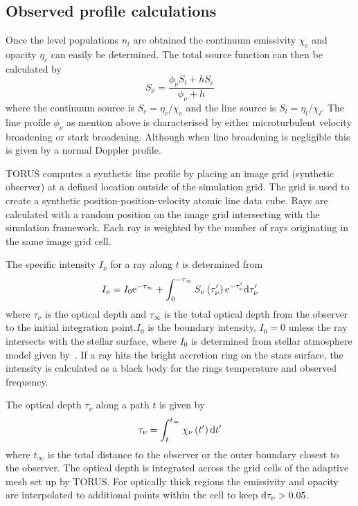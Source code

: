 \documentclass[fleqn,usenatbib]{mnras}
\begin{document}
\subsection{Observed profile calculations}
\label{sec:profilecalculations}
Once the level populations $n_{l}$ are obtained the continuum emissivity $\chi_c$ and opacity $\eta_c$ can easily be determined. The total source function can then be calculated by
\begin{equation}
    S_{\nu} = \frac{\phi_{\nu}S_l+hS_{c}}{\phi_{\nu}+h}
\end{equation}
where the continuum source is $S_{c}=\eta_{c}/\chi_{c}$ and the line source is $S_{l}=\eta_{l}/\chi_{l}$. The line profile $\phi_{\nu}$ as mention above is characterised by either microturbulent velocity broadening or stark broadening. Although when line broadening is negligible this is given by a normal Doppler profile.

TORUS computes a synthetic line profile by placing an image grid (synthetic observer) at a defined location outside of the simulation grid. The grid is used to create a synthetic position-position-velocity atomic line data cube. Rays are calculated with a random position on the image grid intersecting with the simulation framework. Each ray is weighted by the number of rays originating in the same image grid cell.

The specific intensity $I_{\nu}$ for a ray along $t$ is determined from
\begin{equation}
I_{\nu} = I_{0}{\rm e}^{-\tau_{\infty}} + \int^{-\tau_{\infty}}_{0}S_{\nu}\left(\tau_{\nu}'\right){\rm e}^{-\tau_{\nu}'}{\rm d}\tau_{\nu}'
\end{equation}
where $\tau_{\nu}$ is the optical depth and $\tau_{\infty}$ is the total optical depth from the observer to the initial integration point.$I_0$ is the boundary intensity, $I_0=0$ unless the ray intersects with the stellar surface, where $I_0$ is determined from stellar atmosphere model given by~\citet{1979ApJS...40....1K}. If a ray hits the bright accretion ring on the stars surface, the intensity is calculated as a black body for the rings temperature and observed frequency.

The optical depth $\tau_{\nu}$ along a path $t$ is given by
\begin{equation}
    \tau_{\nu} = \int_{t}^{t_{\infty}} \chi_{\nu}\left(t' \right){\rm d}t'
\end{equation}
where $t_{\infty}$ is the total distance to the observer or the outer boundary closest to the observer. The optical depth is integrated across the grid cells of the adaptive mesh set up by TORUS. For optically thick regions the emissivity and opacity are interpolated to additional points within the cell to keep ${\rm d}\tau_{\nu} > 0.05$. 
\end{document}
